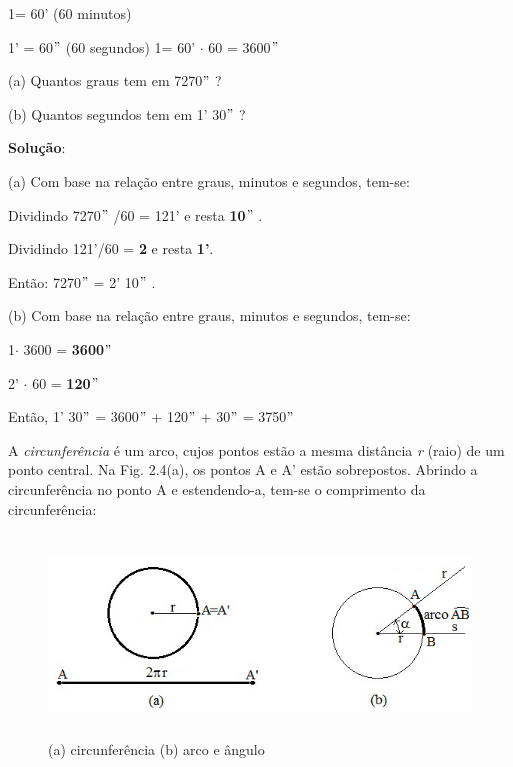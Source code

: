  \begin{caixa}

    1\degree    =    60’  (60 minutos)

    1’    =    60$"$   (60 segundos)
    1\degree    =    60’ $ \cdot $  60 = 3600$"$  

\end{caixa}

\begin{texemplo}
  (a) Quantos graus tem em 7270$"$  ?

  (b) Quantos segundos tem em 1’ 30$"$  ?

\noindent\textbf{Solução}:

(a) Com base na relação entre graus, minutos e segundos, tem-se:

Dividindo 7270$"$ /60 = 121’ e resta \textbf{10$"$ }.

Dividindo 121’/60 = \textbf{2\degree} e resta \textbf{1’}.

Então: 7270$"$  = 2’ 10$"$ .

(b) Com base na relação entre graus, minutos e segundos, tem-se:

1\degree  $ \cdot $   3600 = \textbf{3600$"$ }

2’  $ \cdot $  60     = \textbf{120$"$ }

Então, 1’ 30$"$  = 3600$"$  + 120$"$  + 30$"$  = 3750$"$   \textit{\qedsymbol}

A \textit{circunferência} é um arco, cujos pontos estão a mesma distância \textit{r} (raio) de um ponto central. Na Fig. 2.4(a), os pontos A e A' estão sobrepostos. Abrindo a circunferência no ponto A e estendendo-a, tem-se o comprimento da circunferência:


\end{texemplo}

\begin{figure}[H]
    \begin{Center}
        \includegraphics[width=5.88in,height=2.11in]{capitulos/trigonometria_e_funcoes_trigonometricas/media/image5.png}
    \end{Center}
    \caption{(a) circunferência    (b) arco e ângulo}
\end{figure}

